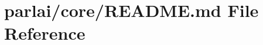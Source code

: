 \hypertarget{parlai_2core_2README_8md}{}\section{parlai/core/\+R\+E\+A\+D\+ME.md File Reference}
\label{parlai_2core_2README_8md}

